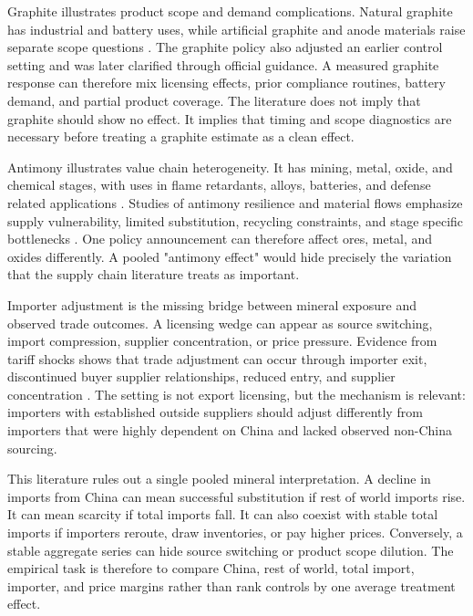 \documentclass[12pt,a4paper]{article}
\numberwithin{equation}{section}
\begin{document}
Graphite illustrates product scope and demand complications. Natural graphite has industrial and battery uses, while artificial graphite and anode materials raise separate scope questions \citep{usgs_mcs_2025,park2025graphite_supply_chain}. The graphite policy also adjusted an earlier control setting and was later clarified through official guidance. A measured graphite response can therefore mix licensing effects, prior compliance routines, battery demand, and partial product coverage. The literature does not imply that graphite should show no effect. It implies that timing and scope diagnostics are necessary before treating a graphite estimate as a clean effect.

Antimony illustrates value chain heterogeneity. It has mining, metal, oxide, and chemical stages, with uses in flame retardants, alloys, batteries, and defense related applications \citep{usgs_mcs_2025}. Studies of antimony resilience and material flows emphasize supply vulnerability, limited substitution, recycling constraints, and stage specific bottlenecks \citep{vandenbrink2022antimony_resilience,xu2025antimony_material_flow}. One policy announcement can therefore affect ores, metal, and oxides differently. A pooled "antimony effect" would hide precisely the variation that the supply chain literature treats as important.

Importer adjustment is the missing bridge between mineral exposure and observed trade outcomes. A licensing wedge can appear as source switching, import compression, supplier concentration, or price pressure. Evidence from tariff shocks shows that trade adjustment can occur through importer exit, discontinued buyer supplier relationships, reduced entry, and supplier concentration \citep{handley_kamal_monarch2024_supply_chain_adjustments}. The setting is not export licensing, but the mechanism is relevant: importers with established outside suppliers should adjust differently from importers that were highly dependent on China and lacked observed non-China sourcing.

This literature rules out a single pooled mineral interpretation. A decline in imports from China can mean successful substitution if rest of world imports rise. It can mean scarcity if total imports fall. It can also coexist with stable total imports if importers reroute, draw inventories, or pay higher prices. Conversely, a stable aggregate series can hide source switching or product scope dilution. The empirical task is therefore to compare China, rest of world, total import, importer, and price margins rather than rank controls by one average treatment effect.
\end{document}
